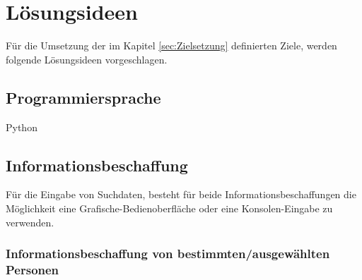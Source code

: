 
\chapter{Lösungsideen}  %
\label{cha:Lösungsideen} %
Für die Umsetzung der im Kapitel \ref{sec:Zielsetzung} definierten Ziele, werden folgende Lösungsideen vorgeschlagen.

\section{Programmiersprache}
Python

\section{Informationsbeschaffung}
Für die Eingabe von Suchdaten, besteht für beide Informationsbeschaffungen die Möglichkeit eine Grafische-Bedienoberfläche oder eine Konsolen-Eingabe zu verwenden.
	\subsection{Informationsbeschaffung von bestimmten/ausgewählten Personen}
		
